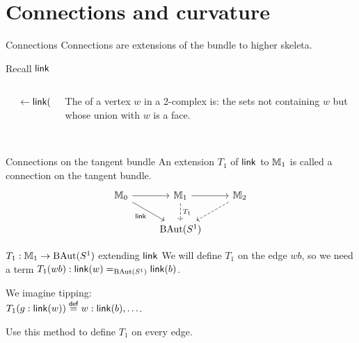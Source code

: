 \section{Connections and curvature}

\begin{frame}{Connections}
Connections are extensions of the bundle to higher skeleta.
\end{frame}

\begin{frame}{Recall \( \operatorname{\mathsf{link}} \)}
\begin{columns}
\begin{column}{0.25\textwidth}

\end{column}
\begin{column}{0.15\textwidth}
\( \leftarrow\operatorname{\mathsf{link}}(w) \)
\end{column}
\begin{column}{0.6\textwidth}
The  of a vertex \( w \) in a 2-complex is: the sets not containing \( w \) but whose union with \( w \) is a face.\\~\\
\end{column}
\end{columns}
\end{frame}

\begin{frame}{Connections on the tangent bundle}
An extension \( T_1 \) of \( \operatorname{\mathsf{link}} \) to \( \mathbb{M}_1 \) is called \alert{a connection on the tangent bundle}.
\[\begin{tikzcd}[ampersand replacement=\&]
  {\mm_0} \& {\mm_1} \& {\mm_2} \\
  \& {\BAut(S^1)}
  \arrow[from=1-1, to=1-2]
  \arrow["\link"', from=1-1, to=2-2]
  \arrow[from=1-2, to=1-3]
  \arrow["{T_1}", dashed, from=1-2, to=2-2]
  \arrow[dashed, from=1-3, to=2-2]
\end{tikzcd}\]
\end{frame}

\begin{frame}{\( T_1:\mathbb{M}_1\to\operatorname{BAut}(S^1) \) extending \( \operatorname{\mathsf{link}} \)}
We will define \( T_1 \) on the edge \( wb \), so we need a term \( T_1(wb):\operatorname{\mathsf{link}}(w)=_{\operatorname{BAut}(S^1)}\operatorname{\mathsf{link}}(b) \).

We imagine tipping:
\[\]
\( T_1(g:\operatorname{\mathsf{link}}(w))\stackrel{\mathsf{def}}{=} w:\operatorname{\mathsf{link}}(b),\ldots \).

Use this method to define \( T_1 \) on every edge.
\end{frame}

